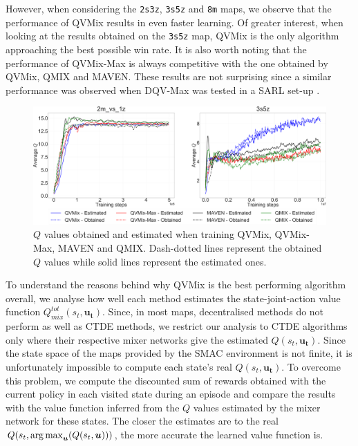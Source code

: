However, when considering the \texttt{2s3z}, \texttt{3s5z} and \texttt{8m} maps, we observe that the performance of QVMix results in even faster learning. 
Of greater interest, when looking at the results obtained on the \texttt{3s5z} map, QVMix is the only algorithm approaching the best possible win rate.
It is also worth noting that the performance of QVMix-Max is always competitive with the one obtained by QVMix, QMIX and MAVEN.
These results are not surprising since a similar performance was observed when DQV-Max was tested in a SARL set-up \cite{sabatelli2020deep}.

\begin{figure}
\centering
\includegraphics[width=.95\linewidth]{tex_thesis/figures/ch4/2m1z3s5zQ.pdf}
\caption{$Q$ values obtained and estimated when training QVMix, QVMix-Max, MAVEN and QMIX. Dash-dotted lines represent the obtained $Q$ values while solid lines represent the estimated ones.}
\label{fig:exp_plots_overestim:q_best_worse}
\end{figure}

To understand the reasons behind why QVMix is the best performing algorithm overall, we analyse how well each method estimates the state-joint-action value function $Q_{mix}^{tot}(s_t, \mathbf{u_t})$. 
Since, in most maps, decentralised methods do not perform as well as CTDE methods, we restrict our analysis to CTDE algorithms only where their respective mixer networks give the estimated $Q(s_t, \mathbf{u_t})$.
Since the state space of the maps provided by the SMAC environment is not finite, it is unfortunately impossible to compute each state's real $Q(s_t, \mathbf{u_t})$.
To overcome this problem, we compute the discounted sum of rewards obtained with the current policy in each visited state during an episode and compare the results with the value function inferred from the $Q$ values estimated by the mixer network for these states.
The closer the estimates are to the real $Q(s_t, \argmax_{\mathbf{u}}(Q(s_t,\mathbf{u})))$, the more accurate the learned value function is.

